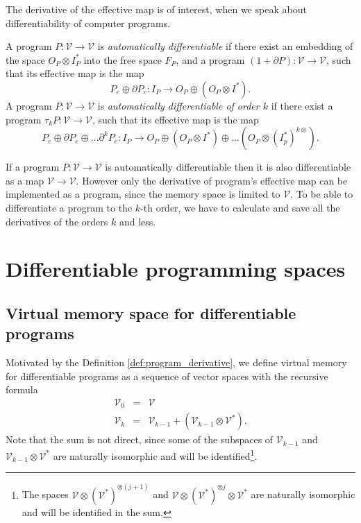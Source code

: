 \documentclass[smallcondensed]{svjour3}
\newcommand{\VV}{\mathcal{V}}
\newcommand{\D}{\partial}
\newcommand{\sumd}{\tau}
\begin{document}
The derivative of the effective map is of interest, when we speak about
differentiability of computer programs. 
\begin{definition}
  \label{def:program_derivative}
  A program $P:\VV\to \VV$ is \emph{automatically differentiable} if there exist
  an embedding of the space $O_P\otimes I_P^*$ into the free space $F_P$, and a program $(1+\D P):\VV\to \VV$,
  such that its effective map is the map
  \begin{equation}
    \label{eq:program_derivative}
    P_e\oplus \D P_e:I_P\rightarrow O_P\oplus (O_P\otimes I^*).
  \end{equation}
  A program $P:\VV\to \VV$ is \emph{automatically differentiable of order $k$}
  if there exist a program $\sumd_k P:\VV\to \VV$,
  such that its effective map is the map
  \begin{equation}
    \label{eq:program_derivative_higher}
    P_e\oplus \D P_e\oplus \ldots \D^k P_e:I_P\rightarrow O_P\oplus \left(O_P\otimes I^*\right)\oplus\ldots \left( O_P\otimes \left( I_p^*\right)^{k\otimes} \right).
  \end{equation}
\end{definition}

If a program $P:\VV\to \VV$ is automatically differentiable then it is also
differentiable as a map $\VV\to\VV$. However only the derivative of program's
effective map can be implemented as a program, since the memory space is limited to $\VV$. 
To be able to differentiate a program to the $k$-th order, we have to calculate
and save all the derivatives of the orders $k$ and less.
\section{Differentiable programming spaces}
\subsection{Virtual memory space for differentiable programs}
Motivated by the Definition
\ref{def:program_derivative}, we define
virtual memory for differentiable programs  as a sequence of vector spaces with
the recursive formula
\begin{eqnarray}
  \VV_0 &=& \VV\\
  \label{eq:universal_space}
  \VV_k &=& \VV_{k-1}+\left(\VV_{k-1}\otimes \VV^*\right).
\end{eqnarray}
Note that the sum is not direct, since some of the subspaces of $\VV_{k-1}$ and
$\VV_{k-1}\otimes \VV^*$ are naturally isomorphic and will be
identified\footnote{The spaces $\VV\otimes(\VV^*)^{\otimes (j+1)}$ and
  $\VV\otimes (\VV^*)^{\otimes j}\otimes \VV^*$ are naturally isomorphic and
  will be identified in the sum.
}.
\end{document}
